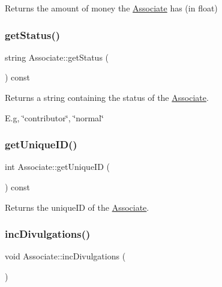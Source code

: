 Returns the amount of money the \hyperlink{classAssociate}{Associate} has (in float) 

\mbox{\label{classAssociate_a9f6109b8164cf8193f9fabd5ff2871f7}} 
\subsubsection{\texorpdfstring{get\+Status()}{getStatus()}}
{\footnotesize\ttfamily string Associate\+::get\+Status (\begin{DoxyParamCaption}{ }\end{DoxyParamCaption}) const}



Returns a string containing the status of the \hyperlink{classAssociate}{Associate}. 

E.\+g, \char`\"{}contributor\char`\"{}, \char`\"{}normal\char`\"{} \mbox{\label{classAssociate_aaca11bf6dea5df3710931898e00a0944}} 
\subsubsection{\texorpdfstring{get\+Unique\+I\+D()}{getUniqueID()}}
{\footnotesize\ttfamily int Associate\+::get\+Unique\+ID (\begin{DoxyParamCaption}{ }\end{DoxyParamCaption}) const}



Returns the unique\+ID of the \hyperlink{classAssociate}{Associate}. 

\mbox{\label{classAssociate_a5d298ea460b494edc46c015af7e1a932}} 
\subsubsection{\texorpdfstring{inc\+Divulgations()}{incDivulgations()}}
{\footnotesize\ttfamily void Associate\+::inc\+Divulgations (\begin{DoxyParamCaption}{ }\end{DoxyParamCaption})}



